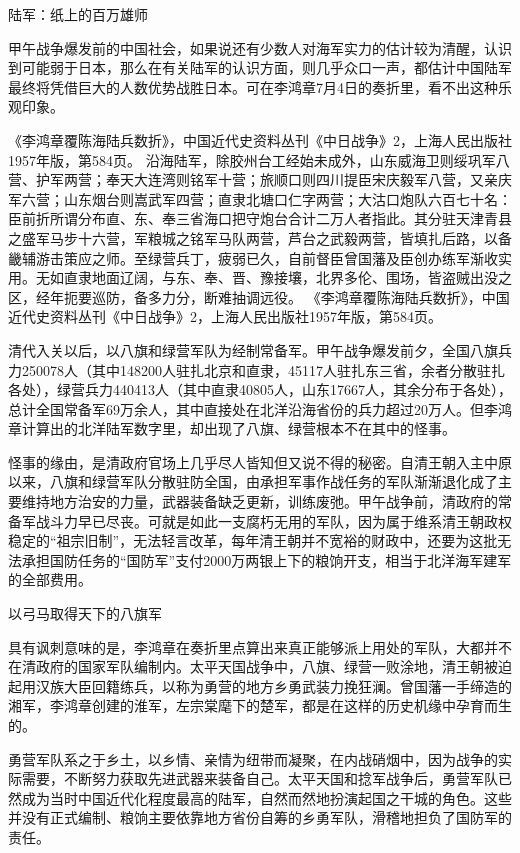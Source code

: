 \documentclass[12pt,UTF8]{ctexbook}
\begin{document}
陆军：纸上的百万雄师

甲午战争爆发前的中国社会，如果说还有少数人对海军实力的估计较为清醒，认识到可能弱于日本，那么在有关陆军的认识方面，则几乎众口一声，都估计中国陆军最终将凭借巨大的人数优势战胜日本。可在李鸿章7月4日的奏折里，看不出这种乐观印象。

《李鸿章覆陈海陆兵数折》，中国近代史资料丛刊《中日战争》2，上海人民出版社1957年版，第584页。
沿海陆军，除胶州台工经始未成外，山东威海卫则绥巩军八营、护军两营；奉天大连湾则铭军十营；旅顺口则四川提臣宋庆毅军八营，又亲庆军六营；山东烟台则嵩武军四营；直隶北塘口仁字两营；大沽口炮队六百七十名：臣前折所谓分布直、东、奉三省海口把守炮台合计二万人者指此。其分驻天津青县之盛军马步十六营，军粮城之铭军马队两营，芦台之武毅两营，皆填扎后路，以备畿辅游击策应之师。至绿营兵丁，疲弱已久，自前督臣曾国藩及臣创办练军渐收实用。无如直隶地面辽阔，与东、奉、晋、豫接壤，北界多伦、围场，皆盗贼出没之区，经年扼要巡防，备多力分，断难抽调远役。 《李鸿章覆陈海陆兵数折》，中国近代史资料丛刊《中日战争》2，上海人民出版社1957年版，第584页。

清代入关以后，以八旗和绿营军队为经制常备军。甲午战争爆发前夕，全国八旗兵力250078人（其中148200人驻扎北京和直隶，45117人驻扎东三省，余者分散驻扎各处），绿营兵力440413人（其中直隶40805人，山东17667人，其余分布于各处），总计全国常备军69万余人，其中直接处在北洋沿海省份的兵力超过20万人。但李鸿章计算出的北洋陆军数字里，却出现了八旗、绿营根本不在其中的怪事。

怪事的缘由，是清政府官场上几乎尽人皆知但又说不得的秘密。自清王朝入主中原以来，八旗和绿营军队分散驻防全国，由承担军事作战任务的军队渐渐退化成了主要维持地方治安的力量，武器装备缺乏更新，训练废弛。甲午战争前，清政府的常备军战斗力早已尽丧。可就是如此一支腐朽无用的军队，因为属于维系清王朝政权稳定的“祖宗旧制”，无法轻言改革，每年清王朝并不宽裕的财政中，还要为这批无法承担国防任务的“国防军”支付2000万两银上下的粮饷开支，相当于北洋海军建军的全部费用。


以弓马取得天下的八旗军

具有讽刺意味的是，李鸿章在奏折里点算出来真正能够派上用处的军队，大都并不在清政府的国家军队编制内。太平天国战争中，八旗、绿营一败涂地，清王朝被迫起用汉族大臣回籍练兵，以称为勇营的地方乡勇武装力挽狂澜。曾国藩一手缔造的湘军，李鸿章创建的淮军，左宗棠麾下的楚军，都是在这样的历史机缘中孕育而生的。

勇营军队系之于乡土，以乡情、亲情为纽带而凝聚，在内战硝烟中，因为战争的实际需要，不断努力获取先进武器来装备自己。太平天国和捻军战争后，勇营军队已然成为当时中国近代化程度最高的陆军，自然而然地扮演起国之干城的角色。这些并没有正式编制、粮饷主要依靠地方省份自筹的乡勇军队，滑稽地担负了国防军的责任。
\end{document}
